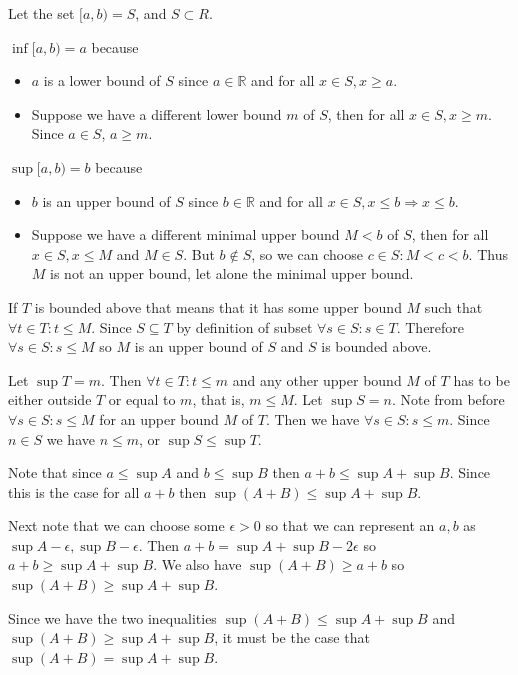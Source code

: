\documentclass{homework}
\begin{document}
\question
Let the set $[a, b) = S$, and $S \subset R$.

$\inf [a, b) = a$ because
\begin{itemize}
    \item $a$ is a lower bound of $S$ since $a \in \mathbb{R} $ and for all $x \in S, x \geq a$.
    \item Suppose we have a different lower bound $m$ of $S$, then for all $x \in S, x \geq m$. Since $a \in S$, $a \geq m$.
\end{itemize}

$\sup [a, b) = b$ because 
\begin{itemize}
    \item $b$ is an upper bound of $S$ since $b \in \mathbb{R}$ and for all $x \in S, x \le b \Rightarrow x \leq b$.
    \item Suppose we have a different minimal upper bound $M < b$ of $S$, then for all $x \in S, x \leq M$ and $M \in S$. But $b \notin S$, so we can choose $c \in S: M < c < b$. Thus $M$ is not an upper bound, let alone the minimal upper bound.
\end{itemize}


\question
If $T$ is bounded above that means that it has some upper bound $M$ such that $\forall t \in T: t \leq M$. Since $S \subseteq T$ by definition of subset $\forall s \in S: s \in T$. Therefore $\forall s \in S: s \leq M$ so $M$ is an upper bound of $S$ and $S$ is bounded above.

Let $\sup T = m$. Then $\forall t \in T: t \leq m$ and any other upper bound $M$ of $T$ has to be either outside $T$ or equal to $m$, that is, $m \leq M$. Let $\sup S = n$. Note from before $\forall s \in S: s \leq M$ for an upper bound $M$ of $T$. Then we have $\forall s \in S: s \leq m$. Since $n \in S$ we have $n \leq m$, or $\sup S \leq \sup T$.


\question
Note that since $a \leq \sup A$ and $b \leq \sup B$ then $a + b \leq \sup A + \sup B$. Since this is the case for all $a+b$ then $\sup(A+B) \leq \sup A + \sup B$.

Next note that we can choose some $\epsilon > 0$ so that we can represent an $a, b$ as $\sup A - \epsilon, \sup B - \epsilon$. Then $a+b = \sup A + \sup B - 2\epsilon$ so $a+b \geq \sup A + \sup B$. We also have $\sup (A+B) \geq a+b$ so $\sup (A+B) \geq \sup A + \sup B$.

Since we have the two inequalities $\sup(A+B) \leq \sup A + \sup B$ and $\sup (A+B) \geq \sup A + \sup B$, it must be the case that $\sup(A+B) = \sup A + \sup B$.
\end{document}
